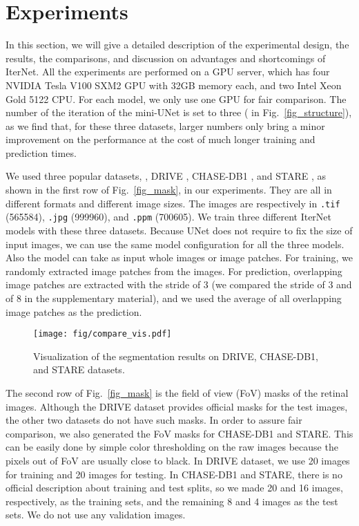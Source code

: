 \documentclass[10pt,twocolumn,letterpaper]{article}
\begin{document}
\section{Experiments}\label{section_experiment}

In this section, we will give a detailed description of the experimental design, the results, the comparisons, and discussion on advantages and shortcomings of IterNet. All the experiments are performed on a GPU server, which has four NVIDIA Tesla V100 SXM2 GPU with 32GB memory each, and two Intel Xeon Gold 5122 CPU. For each model, we only use one GPU for fair comparison. The number of the iteration of the mini-UNet is set to three ( in Fig.~\ref{fig_structure}), as we find that, for these three datasets, larger numbers only bring a minor improvement on the performance at the cost of much longer training and prediction times.

We used three popular datasets, \ie, DRIVE \cite{staal:2004-855}, CHASE-DB1 \cite{owen2009measuring}, and STARE \cite{845178}, as shown in the first row of Fig.~\ref{fig_mask}, in our experiments. They are all in different formats and different image sizes. The images are respectively in \texttt{.tif} (565584), \texttt{.jpg} (999960), and \texttt{.ppm} (700605). We train three different IterNet models with these three datasets. Because UNet does not require to fix the size of input images, we can use the same model configuration for all the three models. Also the model can take as input whole images or image patches. For training, we randomly extracted image patches from the images. For prediction, overlapping image patches are extracted with the stride of 3 (we compared the stride of 3 and of 8 in the supplementary material), and we used the average of all overlapping image patches as the prediction.


\begin{figure*}[!t]
	\setlength{\fboxsep}{0pt}\setlength{\fboxrule}{0.2pt}

	\centering
	\texttt{[image: fig/compare\_vis.pdf]}
	\caption{Visualization of the segmentation results on DRIVE, CHASE-DB1, and STARE datasets.}
	\label{fig_vis}
\end{figure*}

The second row of Fig.~\ref{fig_mask} is the field of view (FoV) masks of the retinal images. Although the DRIVE dataset provides official masks for the test images, the other two datasets do not have such masks. In order to assure fair comparison, we also generated the FoV masks for CHASE-DB1 and STARE. This can be easily done by simple color thresholding on the raw images because the pixels out of FoV are usually close to black.
In DRIVE dataset, we use 20 images for training and 20 images for testing. In CHASE-DB1 and STARE, there is no official description about training and test splits, so we made 20 and 16 images, respectively, as the training sets, and the remaining 8 and 4 images as the test sets. We do not use any validation images.
\end{document}
